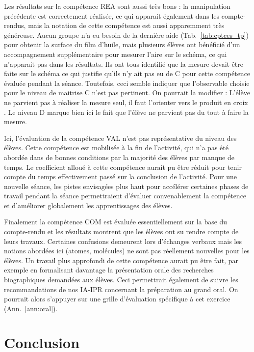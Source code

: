 \documentclass[12pt,a4paper, fleqn]{report}
\newcommand{\rea}{\colorbox{yellow_c}{\textcolor{yellow_f}{REA}}}
\newcommand{\val}{\colorbox{orange_c}{\textcolor{orange_f}{VAL}}}
\newcommand{\com}{\colorbox{red_c}{\textcolor{red_f}{COM}}}
\begin{document}
Les résultats sur la compétence \rea{} sont aussi très bons : la manipulation précédente est correctement réalisée, ce qui apparait également dans les compte-rendus, mais la notation de cette compétence est aussi apparemment très généreuse.
Aucun groupe n'a eu besoin de la dernière aide (Tab.~\ref{tab:cptces_tp}) pour obtenir la surface du film d'huile, mais plusieurs élèves ont bénéficié d'un accompagnement supplémentaire pour mesurer l'aire sur le schéma, ce qui n'apparait pas dans les résultats.
Ils ont tous identifié que la mesure devait être faite sur le schéma ce qui justifie qu'ils n'y ait pas eu de C pour cette compétence évaluée pendant la séance.
Toutefois, ceci semble indiquer que l'observable choisie pour le niveau de maitrise C n'est pas pertinent. On pourrait la modifier : \og L'élève ne parvient pas à réaliser la mesure seul, il faut l'orienter vers le produit en croix \fg{}.
Le niveau D marque bien ici le fait que l'élève ne parvient pas du tout à faire la mesure.

Ici, l'évaluation de la compétence \val{} n'est pas représentative du niveau des élèves.
Cette compétence est mobilisée à la fin de l'activité, qui n'a pas été abordée dans de bonnes conditions par la majorité des élèves par manque de temps.
Le coefficient alloué à cette compétence aurait pu être réduit pour tenir compte du temps effectivement passé sur la conclusion de l'activité.
Pour une nouvelle séance, les pistes envisagées plus haut pour accélérer certaines phases de travail pendant la séance permettraient d'évaluer convenablement la compétence et d'améliorer globalement les apprentissages des élèves.

Finalement la compétence \com{} est évaluée essentiellement sur la base du compte-rendu et les résultats montrent que les élèves ont su rendre compte de leurs travaux.
Certaines confusions demeurent lors d'échanges verbaux mais les notions abordées ici (atomes, molécules) ne sont pas réellement nouvelles pour les élèves.
Un travail plus approfondi de cette compétence aurait pu être fait, par exemple en formalisant davantage la présentation orale des recherches biographiques demandées aux élèves.
Ceci permettrait également de suivre les recommandations de nos IA-IPR concernant la préparation au grand oral.
On pourrait alors s'appuyer sur une grille d'évaluation spécifique à cet exercice (Ann.~\ref{ann:oral}).


\section*{Conclusion}
\end{document}
